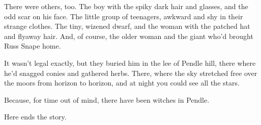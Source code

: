 There were others, too. The boy with the spiky dark hair and glasses, and the odd scar on his face. The little group of teenagers, awkward and shy in their strange clothes. The tiny, wizened dwarf, and the woman with the patched hat and flyaway hair. And, of course, the older woman and the giant who'd brought Russ Snape home.

It wasn't legal exactly, but they buried him in the lee of Pendle hill, there where he'd snagged conies and gathered herbs. There, where the sky stretched free over the moors from horizon to horizon, and at night you could see all the stars.

Because, for time out of mind, there have been witches in Pendle.

\sbreak

Here ends the story.
